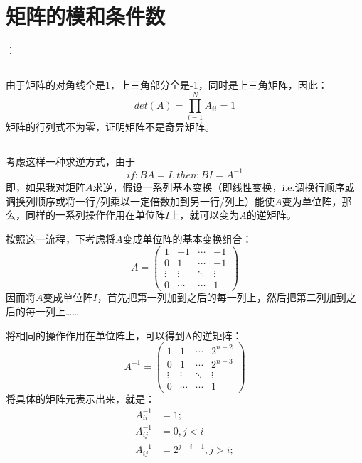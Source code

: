 \documentclass{ctexart}
\begin{document}
    \section{矩阵的模和条件数}：
    \subsection{}
    由于矩阵的对角线全是1，上三角部分全是-1，同时是上三角矩阵，因此：
    $$det(A)=\prod_{i=1}^{N}A_{ii}=1$$
    矩阵的行列式不为零，证明矩阵不是奇异矩阵。
    \subsection{}
    考虑这样一种求逆方式，由于
    $$if:BA=I,then:BI=A^{-1}$$
    即，如果我对矩阵$A$求逆，假设一系列基本变换（即线性变换，i.e.调换行顺序或调换列顺序或将一行/列乘以一定倍数加到另一行/列上）能使$A$变为单位阵，那么，同样的一系列操作作用在单位阵$I$上，就可以变为$A$的逆矩阵。
    \par
    按照这一流程，下考虑将$A$变成单位阵的基本变换组合：
    $$
        A=
        \left(
            \begin{matrix}
                1&-1&\cdots&-1\\
                0&1&\cdots&-1\\
                \vdots&\vdots&\ddots&\vdots\\
                0&\cdots&\cdots&1
            \end{matrix}
        \right)
    $$
    因而将$A$变成单位阵$I$，首先把第一列加到之后的每一列上，然后把第二列加到之后的每一列上……
    \par
    将相同的操作作用在单位阵上，可以得到A的逆矩阵：
    $$
        A^{-1}=
        \left(
            \begin{matrix}
                1&1&\cdots&2^{n-2}\\
                0&1&\cdots&2^{n-3}\\
                \vdots&\vdots&\ddots&\vdots\\
                0&\cdots&\cdots&1
            \end{matrix}
        \right)
    $$
    将具体的矩阵元表示出来，就是：
    \begin{align*}
        A^{-1}_{ii}&=1;\\
        A^{-1}_{ij}&=0,j<i\\
        A^{-1}_{ij}&=2^{j-i-1},j>i;
    \end{align*}
\end{document}
